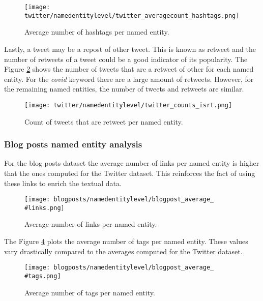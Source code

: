 \begin{figure}[H]
	\begin{center}
		\texttt{[image: twitter/namedentitylevel/twitter\_averagecount\_hashtags.png]}
		\caption{Average number of hashtags per named entity.}
		\label{fig:twitter_averagecount_hashtags}
	\end{center}
\end{figure}

\par Lastly, a tweet may be a repost of other tweet. This is known as retweet and the number of retweets of a tweet could be a good indicator of its popularity. The Figure \ref{fig:twitter_counts_isrt} shows the number of tweets that are a retweet of other for each named entity. For the \textit{covid} keyword there are a large amount of retweets. However, for the remaining named entities, the number of tweets and retweets are similar.
\begin{figure}[H]
	\begin{center}
		\texttt{[image: twitter/namedentitylevel/twitter\_counts\_isrt.png]}
		\caption{Count of tweets that are retweet per named entity.}
		\label{fig:twitter_counts_isrt}
	\end{center}
\end{figure}


\subsubsection{Blog posts named entity analysis}
For the blog posts dataset the average number of links per named entity is higher that the ones computed for the Twitter dataset. This reinforces the fact of using these links to enrich the textual data.

\begin{figure}[H]
	\begin{center}
		\texttt{[image: blogposts/namedentitylevel/blogpost\_average\_\\\#links.png]}
		\caption{Average number of links per named entity.}
		\label{fig:blogpost_average_links}
	\end{center}
\end{figure}

\par  The Figure \ref{fig:blogpost_average_tags_entity} plots the average number of tags per named entity. These values vary drastically compared to the averages computed for the Twitter dataset.
\begin{figure}[H]
	\begin{center}
		\texttt{[image: blogposts/namedentitylevel/blogpost\_average\_\\\#tags.png]}
		\caption{Average number of tags per named entity.}
		\label{fig:blogpost_average_tags_entity}
	\end{center}
\end{figure}

